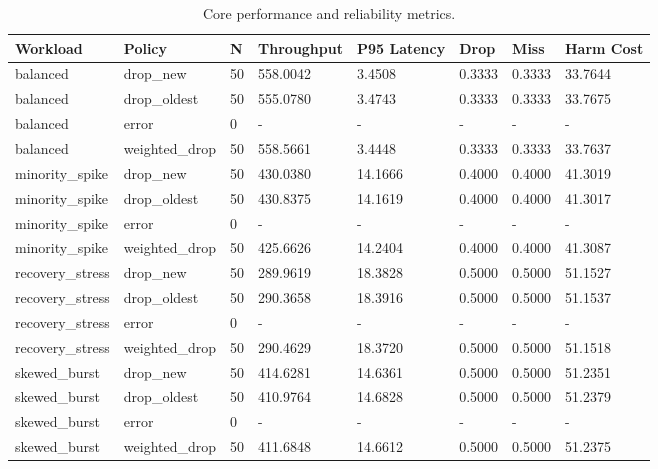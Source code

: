\begin{table}[t]
\centering
\caption{Core performance and reliability metrics.}
\label{tab:core_metrics}
\begin{tabular}{llllllll}
\hline
Workload & Policy & N & Throughput & P95 Latency & Drop & Miss & Harm Cost \\
\hline
balanced & drop\_new & 50 & 558.0042 & 3.4508 & 0.3333 & 0.3333 & 33.7644 \\
balanced & drop\_oldest & 50 & 555.0780 & 3.4743 & 0.3333 & 0.3333 & 33.7675 \\
balanced & error & 0 & - & - & - & - & - \\
balanced & weighted\_drop & 50 & 558.5661 & 3.4448 & 0.3333 & 0.3333 & 33.7637 \\
minority\_spike & drop\_new & 50 & 430.0380 & 14.1666 & 0.4000 & 0.4000 & 41.3019 \\
minority\_spike & drop\_oldest & 50 & 430.8375 & 14.1619 & 0.4000 & 0.4000 & 41.3017 \\
minority\_spike & error & 0 & - & - & - & - & - \\
minority\_spike & weighted\_drop & 50 & 425.6626 & 14.2404 & 0.4000 & 0.4000 & 41.3087 \\
recovery\_stress & drop\_new & 50 & 289.9619 & 18.3828 & 0.5000 & 0.5000 & 51.1527 \\
recovery\_stress & drop\_oldest & 50 & 290.3658 & 18.3916 & 0.5000 & 0.5000 & 51.1537 \\
recovery\_stress & error & 0 & - & - & - & - & - \\
recovery\_stress & weighted\_drop & 50 & 290.4629 & 18.3720 & 0.5000 & 0.5000 & 51.1518 \\
skewed\_burst & drop\_new & 50 & 414.6281 & 14.6361 & 0.5000 & 0.5000 & 51.2351 \\
skewed\_burst & drop\_oldest & 50 & 410.9764 & 14.6828 & 0.5000 & 0.5000 & 51.2379 \\
skewed\_burst & error & 0 & - & - & - & - & - \\
skewed\_burst & weighted\_drop & 50 & 411.6848 & 14.6612 & 0.5000 & 0.5000 & 51.2375 \\
\hline
\end{tabular}
\end{table}
